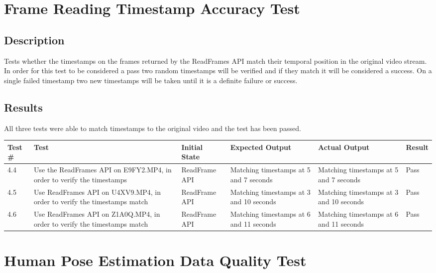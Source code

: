 \documentclass{scrreprt}
\begin{document}
\section{Frame Reading Timestamp Accuracy Test}
\subsection{Description}

Tests whether the timestamps on the frames returned by the ReadFrames API match their temporal position in the original video stream. In order for this test to be considered a pass two random timestamps will be verified and if they match it will be considered a success. On a single failed timestamp two new timestamps will be taken until it is a definite failure or success.

\subsection{Results}

All three tests were able to match timestamps to the original video and the test has been passed.

\begin{table}[H]
        \centering
        \begin{tabular}[t]{||p{0.75cm}|p{4cm}|p{2.5cm}|p{3cm}|p{2.5cm}|p{0.75cm}||}
                \hline
                \textbf Test \# & \textbf Test & \textbf Initial State & \textbf Expected Output & \textbf Actual Output & \textbf Result\\
                \hline\hline
                4.4 & Use the ReadFrames API on E9FY2.MP4, in order to verify the timestamps & ReadFrame API & Matching timestamps at 5 and 7 seconds & Matching timestamps at 5 and 7 seconds & Pass\\
                \hline
                4.5 & Use ReadFrames API on U4XV9.MP4, in order to verify the timestamps match & ReadFrame API & Matching timestamps at 3 and 10 seconds & Matching timestamps at 3 and 10 seconds & Pass\\
                \hline
                4.6 & Use ReadFrames API on Z1A0Q.MP4, in order to verify the timestamps match & ReadFrame API & Matching timestamps at 6 and 11 seconds & Matching timestamps at 6 and 11 seconds  & Pass\\
                \hline
        \end{tabular}
\end{table}

\section{Human Pose Estimation Data Quality Test}
\end{document}
